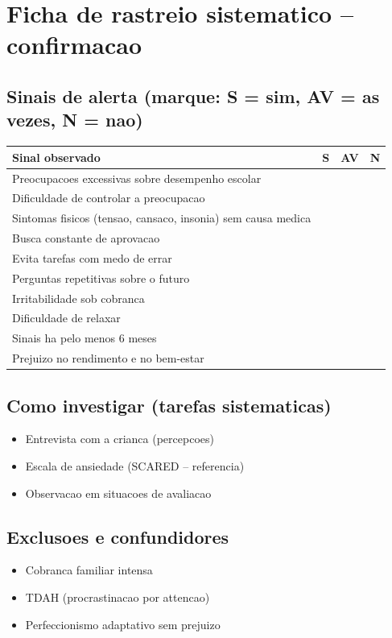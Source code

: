 \documentclass[a4paper,11pt]{book}
\begin{document}
\section*{Ficha de rastreio sistematico -- confirmacao}
\subsection*{Sinais de alerta (marque: S = sim, AV = as vezes, N = nao)}
\begin{tabular}{@{}p{11.5cm}ccc@{}}\toprule
Sinal observado & S & AV & N \\\midrule
Preocupacoes excessivas sobre desempenho escolar & & & \\
Dificuldade de controlar a preocupacao & & & \\
Sintomas fisicos (tensao, cansaco, insonia) sem causa medica & & & \\
Busca constante de aprovacao & & & \\
Evita tarefas com medo de errar & & & \\
Perguntas repetitivas sobre o futuro & & & \\
Irritabilidade sob cobranca & & & \\
Dificuldade de relaxar & & & \\
Sinais ha pelo menos 6 meses & & & \\
Prejuizo no rendimento e no bem-estar & & & \\
\bottomrule\end{tabular}
\subsection*{Como investigar (tarefas sistematicas)}
\begin{itemize}
\item Entrevista com a crianca (percepcoes)
\item Escala de ansiedade (SCARED -- referencia)
\item Observacao em situacoes de avaliacao
\end{itemize}
\subsection*{Exclusoes e confundidores}
\begin{itemize}
\item Cobranca familiar intensa
\item TDAH (procrastinacao por attencao)
\item Perfeccionismo adaptativo sem prejuizo
\end{itemize}
\end{document}
